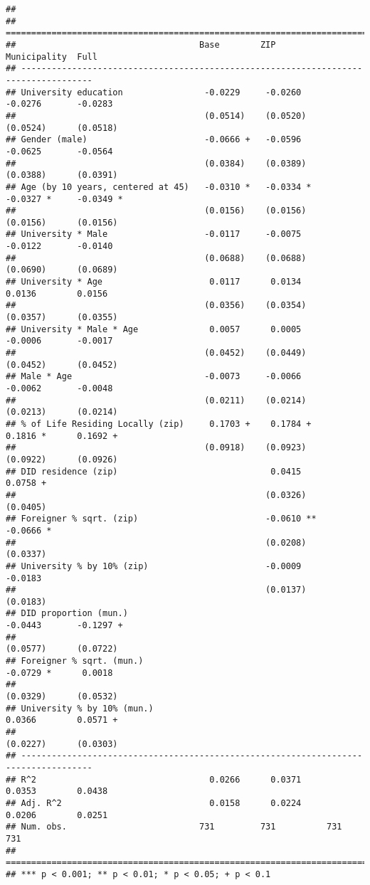 \documentclass[
]{article}
\begin{document}
\begin{verbatim}
## 
## ====================================================================================
##                                    Base        ZIP          Municipality  Full      
## ------------------------------------------------------------------------------------
## University education                -0.0229     -0.0260      -0.0276       -0.0283  
##                                     (0.0514)    (0.0520)     (0.0524)      (0.0518) 
## Gender (male)                       -0.0666 +   -0.0596      -0.0625       -0.0564  
##                                     (0.0384)    (0.0389)     (0.0388)      (0.0391) 
## Age (by 10 years, centered at 45)   -0.0310 *   -0.0334 *    -0.0327 *     -0.0349 *
##                                     (0.0156)    (0.0156)     (0.0156)      (0.0156) 
## University * Male                   -0.0117     -0.0075      -0.0122       -0.0140  
##                                     (0.0688)    (0.0688)     (0.0690)      (0.0689) 
## University * Age                     0.0117      0.0134       0.0136        0.0156  
##                                     (0.0356)    (0.0354)     (0.0357)      (0.0355) 
## University * Male * Age              0.0057      0.0005      -0.0006       -0.0017  
##                                     (0.0452)    (0.0449)     (0.0452)      (0.0452) 
## Male * Age                          -0.0073     -0.0066      -0.0062       -0.0048  
##                                     (0.0211)    (0.0214)     (0.0213)      (0.0214) 
## % of Life Residing Locally (zip)     0.1703 +    0.1784 +     0.1816 *      0.1692 +
##                                     (0.0918)    (0.0923)     (0.0922)      (0.0926) 
## DID residence (zip)                              0.0415                     0.0758 +
##                                                 (0.0326)                   (0.0405) 
## Foreigner % sqrt. (zip)                         -0.0610 **                 -0.0666 *
##                                                 (0.0208)                   (0.0337) 
## University % by 10% (zip)                       -0.0009                    -0.0183  
##                                                 (0.0137)                   (0.0183) 
## DID proportion (mun.)                                        -0.0443       -0.1297 +
##                                                              (0.0577)      (0.0722) 
## Foreigner % sqrt. (mun.)                                     -0.0729 *      0.0018  
##                                                              (0.0329)      (0.0532) 
## University % by 10% (mun.)                                    0.0366        0.0571 +
##                                                              (0.0227)      (0.0303) 
## ------------------------------------------------------------------------------------
## R^2                                  0.0266      0.0371       0.0353        0.0438  
## Adj. R^2                             0.0158      0.0224       0.0206        0.0251  
## Num. obs.                          731         731          731           731       
## ====================================================================================
## *** p < 0.001; ** p < 0.01; * p < 0.05; + p < 0.1
\end{verbatim}
\end{document}
